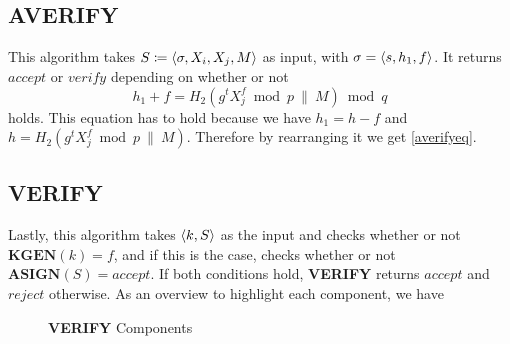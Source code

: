 \subsection{\textbf{AVERIFY}}
  This algorithm takes \(S \coloneqq \langle \sigma, X_i, X_j, M \rangle\) as input, with \(\sigma=\langle s,h_1, f \rangle\).
  It returns \(accept\) or \(verify\) depending on whether or not 
    \begin{equation}
      h_1 + f = H_2(g^t X_j^f \bmod p ~\|~ M) \bmod q \label{averifyeq}
    \end{equation}
  holds. 
  This equation has to hold because we have \(h_1 = h - f\) and \(h = H_2(g^t X_j^f \bmod p ~\|~ M)\).
  Therefore by rearranging it we get \autoref{averifyeq}.

\subsection{\textbf{VERIFY}}
  Lastly, this algorithm takes \(\langle k,S \rangle\) as the input and checks whether or not \(\textbf{KGEN}(k) = f\), and if this is the case, checks whether or not \(\textbf{ASIGN}(S)=accept\).
  If both conditions hold, \textbf{VERIFY} returns \(accept\) and \(reject\) otherwise.
  As an overview to highlight each component, we have

  \begin{figure}[htbp]
    
    \begin{center}
    \end{center}
    
    \caption{\textbf{VERIFY} Components}
    \label{fig:verifycomp}
  \end{figure}
